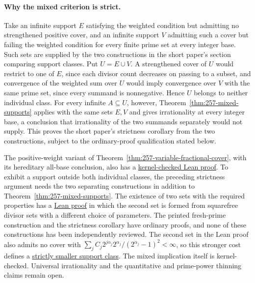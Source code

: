 \paragraph{Why the mixed criterion is strict.}\label{record257:strict-mixed-proof}
Take an infinite support $E$ satisfying the weighted condition but
admitting no strengthened positive cover, and an infinite support $V$
admitting such a cover but failing the weighted condition for every
finite prime set at every integer base. Such sets are supplied by the
two constructions in the short paper's section comparing support classes.
Put $U=E\cup V$. A strengthened cover of $U$ would restrict to one of $E$,
since each divisor count decreases on passing to a subset, and
convergence of the weighted sum over $U$ would imply convergence over $V$
with the same prime set, since every summand is nonnegative. Hence $U$
belongs to neither individual class. For every infinite $A\subseteq U$,
however, Theorem~\ref{thm:257-mixed-supports} applies with the same sets
$E,V$ and gives irrationality at every integer base, a conclusion that
irrationality of the two summands separately would not supply. This
proves the short paper's strictness corollary from the two constructions,
subject to the ordinary-proof qualification stated below.

The positive-weight variant of
Theorem~\ref{thm:257-variable-fractional-cover}, with its hereditary
all-base conclusion, also has a
\href{https://github.com/wcook04/plectis-erdos/blob/c91562bd574a387cde904481e609c7b4cacebb14/lean/ErdosProblems/Erdos257/PaperCompleteR8/ArbitraryWeightMixedClaim.lean#L19}{kernel-checked Lean proof}.
To exhibit a support outside both individual classes, the preceding
strictness argument needs the two separating constructions in addition
to Theorem~\ref{thm:257-mixed-supports}. The existence of two sets with
the required properties has a
\href{https://github.com/wcook04/plectis-erdos/blob/3973d3b10bce72017b8f60093f0d6c3f4f592d80/lean/ErdosProblems/Erdos257/PaperCompleteR8/AnalyticIncomparability.lean#L53}{Lean proof}
in which the second set is formed from squarefree divisor sets with a
different choice of parameters. The printed fresh-prime construction and
the strictness corollary have ordinary proofs, and none of these
constructions has been independently reviewed. The second set in the Lean proof also admits no cover with
$\sum_jC_j2^{j\alpha_j}2^{\alpha_j}/(2^{\alpha_j}-1)^2<\infty$, so this
stronger cost defines a
\href{https://github.com/wcook04/plectis-erdos/blob/3973d3b10bce72017b8f60093f0d6c3f4f592d80/lean/ErdosProblems/Erdos257/PaperCompleteR8/AnalyticIncomparability.lean#L41}{strictly smaller support class}.
The mixed implication itself is kernel-checked.
Universal irrationality and the quantitative and prime-power thinning claims
remain open.


